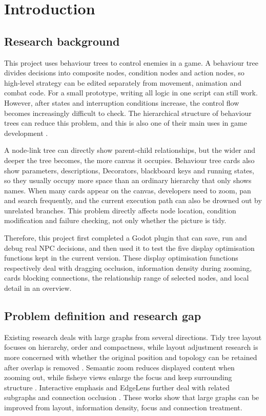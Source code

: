 \chapter{Introduction}

\section{Research background}

This project uses behaviour trees to control enemies in a game. A behaviour tree divides decisions into composite nodes, condition nodes and action nodes, so high-level strategy can be edited separately from movement, animation and combat code. For a small prototype, writing all logic in one script can still work. However, after states and interruption conditions increase, the control flow becomes increasingly difficult to check. The hierarchical structure of behaviour trees can reduce this problem, and this is also one of their main uses in game development \parencite{colledanchise2018book,iovino2022survey}.

A node-link tree can directly show parent-child relationships, but the wider and deeper the tree becomes, the more canvas it occupies. Behaviour tree cards also show parameters, descriptions, Decorators, blackboard keys and running states, so they usually occupy more space than an ordinary hierarchy that only shows names. When many cards appear on the canvas, developers need to zoom, pan and search frequently, and the current execution path can also be drowned out by unrelated branches. This problem directly affects node location, condition modification and failure checking, not only whether the picture is tidy.

Therefore, this project first completed a Godot plugin that can save, run and debug real NPC decisions, and then used it to test the five display optimisation functions kept in the current version. These display optimisation functions respectively deal with dragging occlusion, information density during zooming, cards blocking connections, the relationship range of selected nodes, and local detail in an overview.

\section{Problem definition and research gap}

Existing research deals with large graphs from several directions. Tidy tree layout focuses on hierarchy, order and compactness, while layout adjustment research is more concerned with whether the original position and topology can be retained after overlap is removed \parencite{reingold1981tidier,sugiyama1981methods,misue1995mentalmap,dwyer2006fast}. Semantic zoom reduces displayed content when zooming out, while fisheye views enlarge the focus and keep surrounding structure \parencite{bederson1996pad,furnas1986fisheye}. Interactive emphasis and EdgeLens further deal with related subgraphs and connection occlusion \parencite{ware2005queries,wong2003edgelens}. These works show that large graphs can be improved from layout, information density, focus and connection treatment.

